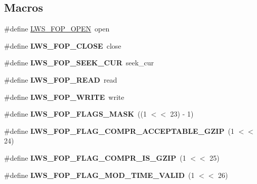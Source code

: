 \subsection*{Macros}
\begin{DoxyCompactItemize}
\item 
\#define \hyperlink{group__fops_ga7972d4b546c7af37bb76d4c60f2ad553}{L\+W\+S\+\_\+\+F\+O\+P\+\_\+\+O\+P\+EN}~open
\item 
\mbox{\label{group__fops_ga993a0264dac738d32e40bfd802877596}} 
\#define {\bfseries L\+W\+S\+\_\+\+F\+O\+P\+\_\+\+C\+L\+O\+SE}~close
\item 
\mbox{\label{group__fops_ga372b5af81a2927c4a0d8f8ac04e22ea9}} 
\#define {\bfseries L\+W\+S\+\_\+\+F\+O\+P\+\_\+\+S\+E\+E\+K\+\_\+\+C\+UR}~seek\+\_\+cur
\item 
\mbox{\label{group__fops_gab0daaa4c50c0689f5ecddbc93b258052}} 
\#define {\bfseries L\+W\+S\+\_\+\+F\+O\+P\+\_\+\+R\+E\+AD}~read
\item 
\mbox{\label{group__fops_ga8ed9a52c15cb4efa6024a3632fb7a571}} 
\#define {\bfseries L\+W\+S\+\_\+\+F\+O\+P\+\_\+\+W\+R\+I\+TE}~write
\item 
\mbox{\label{group__fops_ga4515771d224d2dbaa6409e1958b81faf}} 
\#define {\bfseries L\+W\+S\+\_\+\+F\+O\+P\+\_\+\+F\+L\+A\+G\+S\+\_\+\+M\+A\+SK}~((1 $<$$<$ 23) -\/ 1)
\item 
\mbox{\label{group__fops_ga95a53aaaba125ce154e455d76d5b2c22}} 
\#define {\bfseries L\+W\+S\+\_\+\+F\+O\+P\+\_\+\+F\+L\+A\+G\+\_\+\+C\+O\+M\+P\+R\+\_\+\+A\+C\+C\+E\+P\+T\+A\+B\+L\+E\+\_\+\+G\+Z\+IP}~(1 $<$$<$ 24)
\item 
\mbox{\label{group__fops_ga5c896c010b90ab0fb6ff9ab96133e4b2}} 
\#define {\bfseries L\+W\+S\+\_\+\+F\+O\+P\+\_\+\+F\+L\+A\+G\+\_\+\+C\+O\+M\+P\+R\+\_\+\+I\+S\+\_\+\+G\+Z\+IP}~(1 $<$$<$ 25)
\item 
\mbox{\label{group__fops_ga2046444d8c9c559a5b4a2e78740e89fc}} 
\#define {\bfseries L\+W\+S\+\_\+\+F\+O\+P\+\_\+\+F\+L\+A\+G\+\_\+\+M\+O\+D\+\_\+\+T\+I\+M\+E\+\_\+\+V\+A\+L\+ID}~(1 $<$$<$ 26)
\item 

\end{DoxyCompactItemize}

